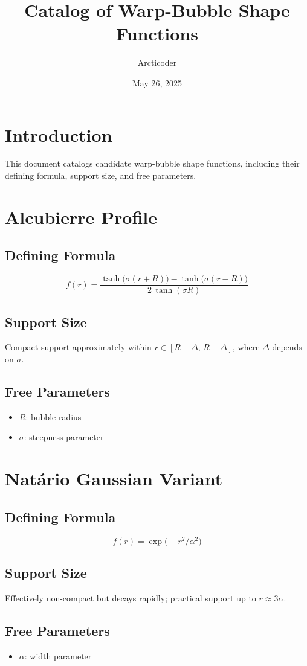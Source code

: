 \documentclass[11pt]{article}
\title{Catalog of Warp-Bubble Shape Functions}
\author{Arcticoder}
\date{May 26, 2025}
\begin{document}
\maketitle

\section*{Introduction}
This document catalogs candidate warp-bubble shape functions, including their defining formula, support size, and free parameters.

\section{Alcubierre Profile}
\subsection*{Defining Formula}
\[
f(r) = \frac{\tanh\bigl(\sigma (r + R)\bigr) - \tanh\bigl(\sigma (r - R)\bigr)}{2\,\tanh(\sigma R)}
\]
\subsection*{Support Size}
Compact support approximately within $r \in [R - \Delta,\, R + \Delta]$, where $\Delta$ depends on $\sigma$.
\subsection*{Free Parameters}
\begin{itemize}
  \item $R$: bubble radius
  \item $\sigma$: steepness parameter
\end{itemize}

\section{Natário Gaussian Variant}
\subsection*{Defining Formula}
\[
f(r) = \exp\!\bigl(-r^2 / \alpha^2\bigr)
\]
\subsection*{Support Size}
Effectively non-compact but decays rapidly; practical support up to $r \approx 3\alpha$.
\subsection*{Free Parameters}
\begin{itemize}
  \item $\alpha$: width parameter
\end{itemize}
\end{document}
